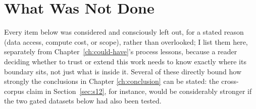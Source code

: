 \documentclass[11pt]{report}
\begin{document}
\chapter{What Was Not Done}
\label{ch:not-done}

Every item below was considered and consciously left out, for a stated
reason (data access, compute cost, or scope), rather than overlooked; I list
them here, separately from Chapter~\ref{ch:could-have}'s process lessons,
because a reader deciding whether to trust or extend this work needs to know
exactly where its boundary sits, not just what is inside it. Several of
these directly bound how strongly the conclusions in Chapter
\ref{ch:conclusion} can be stated: the cross-corpus claim in
Section~\ref{sec:s12}, for instance, would be considerably stronger if the
two gated datasets below had also been tested.
\end{document}
